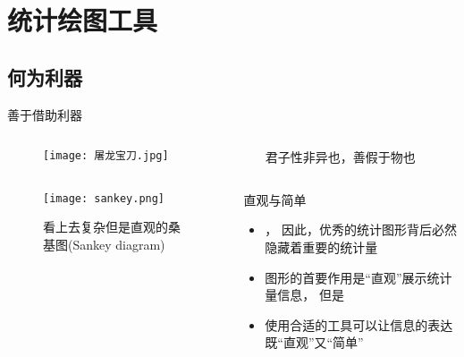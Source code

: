 
\section{统计绘图工具}
\subsection{何为利器}
\begin{frame}{善于借助利器}{}

  \begin{columns}
    \begin{column}{.5\textwidth}
      \begin{figure}
        \centering \texttt{[image: 屠龙宝刀.jpg]}
      \end{figure}
    \end{column}

    \begin{column}{.5\textwidth}
      \begin{ornamentblock}
        \centering
        {君子性非异也，善假于物也\\ %
          }
      \end{ornamentblock}
    \end{column}
  \end{columns}

\end{frame}

\begin{frame}[c]{\subsecname}
  
  \begin{columns}
    \begin{column}{.5\textwidth}
      \begin{figure}
        \centering \texttt{[image: sankey.png]}
        \caption{看上去复杂但是直观的桑基图(Sankey diagram)}
      \end{figure}
    \end{column}

    \begin{column}{.5\textwidth}
      \begin{block}{\small 直观与简单} \small
        \begin{itemize}
        \item[\HandRight] ，
        因此，优秀的统计图形背后必然隐藏着重要的统计量
        \item[\HandRight] 图形的首要作用是“直观”展示统计量信息，
        但是
        \item[\HandRight] 使用合适的工具可以让信息的表达既“直观”又“简单” 
        \end{itemize}
      \end{block}
    \end{column}
  \end{columns}
    
\end{frame}

